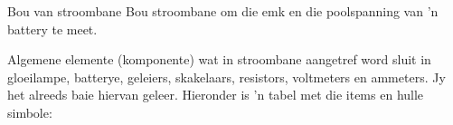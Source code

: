 \begin{activity}{Bou van stroombane}
Bou stroombane om die emk en die poolspanning van 'n battery te meet.

Algemene elemente (komponente) wat in stroombane aangetref word sluit in
gloeilampe, batterye, geleiers, skakelaars, resistors, voltmeters en ammeters.
Jy het alreeds baie hiervan geleer. Hieronder is 'n tabel met die items en
hulle simbole:


\end{activity}
